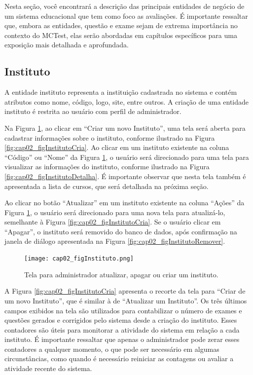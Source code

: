 Nesta seção, você encontrará a descrição das principais entidades de negócio de um sistema educacional que tem como foco as avaliações. É importante ressaltar que, embora as entidades, questão e exame sejam de extrema importância no contexto do MCTest, elas serão abordadas em capítulos específicos para uma exposição mais detalhada e aprofundada.

\subsection{Instituto}\label{sec:instituto}

A entidade instituto representa a instituição cadastrada no sistema e contém atributos como nome, código, logo, site, entre outros.
%
A criação de uma entidade instituto é restrita ao usuário com perfil de administrador. 

Na Figura \ref{fig:instituto}, ao clicar em ``Criar um novo Instituto'', uma tela será aberta para cadastrar informações sobre o instituto, conforme ilustrado na Figura \ref{fig:cap02_figInstitutoCria}. Ao clicar em um instituto existente na coluna ``Código'' ou ``Nome'' da Figura \ref{fig:instituto}, o usuário será direcionado para uma tela para visualizar as informações do instituto, conforme ilustrado na Figura \ref{fig:cap02_figInstitutoDetalha}. É importante observar que nesta tela também é apresentada a lista de cursos, que será detalhada na próxima seção. 

Ao clicar no botão ``Atualizar'' em um instituto existente na coluna ``Ações'' da Figura \ref{fig:instituto}, o usuário será direcionado para uma nova tela para atualizá-lo, semelhante à Figura \ref{fig:cap02_figInstitutoCria}. Se o usuário clicar em ``Apagar'', o instituto será removido do banco de dados, após confirmação na janela de diálogo apresentada na Figura \ref{fig:cap02_figInstitutoRemover}.


\begin{figure}[!ht]
  \centering
  \texttt{[image: cap02\_figInstituto.png]}
  \caption{Tela para administrador atualizar, apagar ou criar um instituto.}
  \label{fig:instituto}
\end{figure}

A Figura \ref{fig:cap02_figInstitutoCria} apresenta o recorte da tela para ``Criar de um novo Instituto'', que é similar à de ``Atualizar um Instituto''. Os três últimos campos exibidos na tela são utilizados para contabilizar o número de exames e questões gerados e corrigidos pelo sistema desde a criação do instituto. Esses contadores são úteis para monitorar a atividade do sistema em relação a cada instituto.
%
É importante ressaltar que apenas o administrador pode zerar esses contadores a qualquer momento, o que pode ser necessário em algumas circunstâncias, como quando é necessário reiniciar as contagens ou avaliar a atividade recente do sistema.

